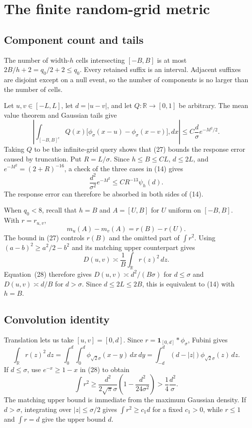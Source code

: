\documentclass{article}
\theoremstyle{definition}
\theoremstyle{remark}
\newcommand{\R}{\mathbb R}
\newcommand{\1}{\mathbf 1}
\begin{document}
\section{The finite random-grid metric}\label{app:metric}

\subsection{Component count and tails}

The number of width-\(h\) cells intersecting \([-B,B]\) is at most \(2B/h+2=q_0/2+2\leq q_0\). Every retained suffix is an interval. Adjacent suffixes are disjoint except on a null event, so the number of components is no larger than the number of cells.

Let \(u,v\in[-L,L]\), let \(d=|u-v|\), and let \(Q:\R\to[0,1]\) be arbitrary. The mean value theorem and Gaussian tails give \[ \left|\int_{[-B,B]^c}Q(x)\bigl[\phi_\sigma(x-u)-\phi_\sigma(x-v)\bigr],dx\right| \leq C\frac d\sigma e^{-M^2/2}. \tag{27} \] Taking \(Q\) to be the infinite-grid query shows that (27) bounds the response error caused by truncation. Put \(R=L/\sigma\). Since \(h\leq B\leq C L\), \(d\leq2L\), and \(e^{-M^2}=(2+R)^{-16}\), a check of the three cases in (14) gives \[ \frac{d^2}{\sigma^2}e^{-M^2}\leq C R^{-13}\psi_h(d). \] The response error can therefore be absorbed in both sides of (14).

When \(q_0<8\), recall that \(h=B\) and \(A=[U,B]\) for \(U\) uniform on \([-B,B]\). With \(r=r_{u,v}\), \[ m_u(A)-m_v(A)=r(B)-r(U). \] The bound in (27) controls \(r(B)\) and the omitted part of \(\int r^2\). Using \((a-b)^2\geq a^2/2-b^2\) and its matching upper counterpart gives \[ D(u,v)\asymp\frac1B\int_\R r(z)^2\,dz. \] Equation~(28) therefore gives \(D(u,v)\asymp d^2/(B\sigma)\) for \(d\leq\sigma\) and \(D(u,v)\asymp d/B\) for \(d>\sigma\). Since \(d\leq2L\leq2B\), this is equivalent to (14) with \(h=B\).

\subsection{Convolution identity}

Translation lets us take \([u,v]=[0,d]\). Since \(r=\1_{[0,d]}*\phi_\sigma\), Fubini gives \[ \int_\R r(z)^2\,dz =\int_0^d\int_0^d\phi_{\sqrt2\sigma}(x-y)\,dx\,dy =\int_{-d}^d(d-|z|)\phi_{\sqrt2\sigma}(z)\,dz. \tag{28} \] If \(d\leq\sigma\), use \(e^{-x}\geq1-x\) in (28) to obtain \[ \int r^2\geq\frac{d^2}{2\sqrt\pi\sigma}\left(1-\frac{d^2}{24\sigma^2}\right)>\frac14\frac{d^2}{\sigma}. \] The matching upper bound is immediate from the maximum Gaussian density. If \(d>\sigma\), integrating over \(|z|\leq\sigma/2\) gives \(\int r^2\geq c_1d\) for a fixed \(c_1>0\), while \(r\leq1\) and \(\int r=d\) give the upper bound \(d\).
\end{document}
